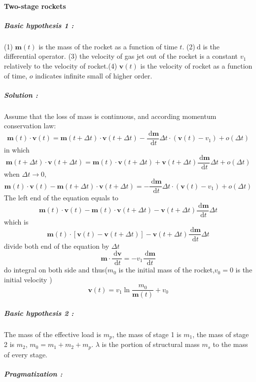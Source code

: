 \documentclass{ctexart}
\newcommand{\df}{\mathrm{~d}}
\begin{document}
\paragraph*{Two-stage rockets}

\subparagraph*{Basic hypothesis 1 :}

(1) $\mathbf{m}(t)$ is the mass of the rocket as a function of time $t$.  (2)$\df$ is the differential operator. (3) the velocity of gas jet out of the rocket is a constant $v_1$ relatively to the velocity of rocket.(4) $\mathbf{v}(t)$ is the velocity of rocket as a function of time, $o$ indicates infinite small of higher order. 

\subparagraph*{Solution :}

Assume that the loss of mass is continuous, and according momentum conservation law:
$$
\mathbf{m}(t) \cdot \mathbf{v}(t) = \mathbf{m}(t+ \Delta t) \cdot \mathbf{v}(t + \Delta t ) - \frac{\df \mathbf{m}}{\df t}\Delta t \cdot (\mathbf{v}(t)-v_1)   + o(\Delta t)
$$
in which 
$$
\mathbf{m}(t+ \Delta t) \cdot \mathbf{v}(t + \Delta t )=\mathbf{m}(t) \cdot \mathbf{v} (t + \Delta t ) + \mathbf{v}(t + \Delta t)\frac{\df \mathbf{m}}{\df t} \Delta t  + o(\Delta t)
$$
when $\Delta t \to 0$,
$$
\mathbf{m}(t) \cdot \mathbf{v}(t) - \mathbf{m}(t+ \Delta t) \cdot \mathbf{v}(t + \Delta t ) = - \frac{\df \mathbf{m}}{\df t}\Delta t \cdot (\mathbf{v}(t)-v_1)   + o(\Delta t)
$$
The left end of the equation equals to 
$$
\mathbf{m}(t) \cdot \mathbf{v}(t) - \mathbf{m}(t) \cdot \mathbf{v} (t + \Delta t ) - \mathbf{v}(t + \Delta t)\frac{\df \mathbf{m}}{\df t} \Delta t 
$$
which is 
$$
\mathbf{m}(t)\cdot[\mathbf{v}(t) - \mathbf{v} (t + \Delta t )]-\mathbf{v}(t + \Delta t)\frac{\df \mathbf{m}}{\df t} \Delta t 
$$
divide both end of the equation by $\Delta t $ 
$$
\mathbf{m} \cdot \frac{\df \mathbf{v}}{\df t } = -v_1 \frac{\df \mathbf{m}}{\df t }
$$
do integral on both side and thus($m_0$ is the initial mass of the rocket,$v_0 =0 $ is the initial velocity ) 
$$
\mathbf{v}(t) = v_1 \ln \frac{m_0}{\mathbf{m}(t)} + v_0
$$

\subparagraph*{Basic hypothesis 2 :}

The mass of the effective load is $m_p$, the mass of stage 1 is $m_1$, the mass of stage 2 is $m_2$, $m_0 = m_1 +m_2 +m_p$. $\lambda $ is the portion of structural mass $m_s$ to  the mass of every stage.

\subparagraph*{Pragmatization : }
\end{document}
